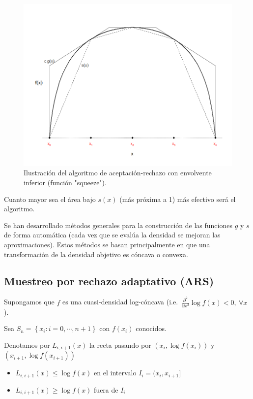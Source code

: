 \documentclass[
]{book}
\theoremstyle{break}
\theoremstyle{nonumberplain}
\begin{document}
\begin{figure}[!htb]

{\centering \includegraphics[width=0.8\linewidth]{images/squeeze} 

}

\caption{Ilustración del algoritmo de aceptación-rechazo con envolvente inferior (función "squeeze").}\label{fig:squeeze}
\end{figure}

Cuanto mayor sea el área bajo \(s(x)\) (más próxima a 1)
más efectivo será el algoritmo.

Se han desarrollado métodos generales para la construcción de las
funciones \(g\) y \(s\) de forma automática
(cada vez que se evalúa la densidad se mejoran las aproximaciones).
Estos métodos se basan principalmente en que una transformación de
la densidad objetivo es cóncava o convexa.

\hypertarget{ars}{%
\subsection{Muestreo por rechazo adaptativo (ARS)}\label{ars}}

Supongamos que \(f\) es una cuasi-densidad log-cóncava
(i.e.~\(\frac{\partial ^{2}}{\partial x^{2}}\log f(x) <0, ~\forall x\)).

Sea \(S_n=\left\{ x_{i}:i=0,\cdots ,n+1\right\}\) con
\(f(x_{i})\) conocidos.

Denotamos por \(L_{i,i+1}(x)\) la recta pasando por \(\left( x_{i},\log f(x_{i})\right)\) y \(\left( x_{i+1},\log f(x_{i+1})\right)\)

\begin{itemize}
\item
  \(L_{i,i+1}(x)\leq \log f(x)\) en el intervalo
  \(I_{i}=(x_{i},x_{i+1}]\)
\item
  \(L_{i,i+1}(x)\geq \log f(x)\) fuera de \(I_{i}\)
\end{itemize}
\end{document}

